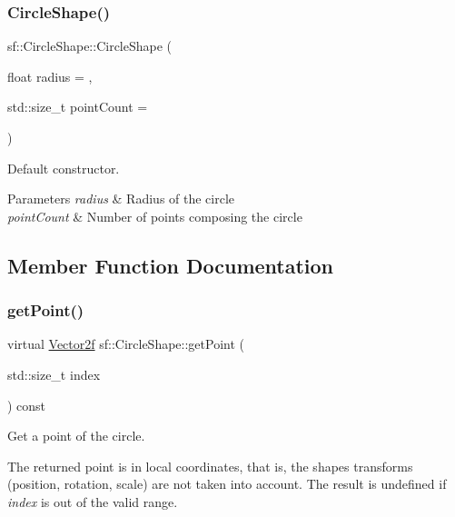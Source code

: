 \subsubsection{\texorpdfstring{Circle\+Shape()}{CircleShape()}}
{\footnotesize\ttfamily sf\+::\+Circle\+Shape\+::\+Circle\+Shape (\begin{DoxyParamCaption}\item[{float}]{radius = {},  }\item[{std\+::size\+\_\+t}]{point\+Count = {} }\end{DoxyParamCaption})\hspace{0.3cm}{\ttfamily [explicit]}}



Default constructor. 


\begin{DoxyParams}{Parameters}
{\em radius} & Radius of the circle \\
\hline
{\em point\+Count} & Number of points composing the circle \\
\hline
\end{DoxyParams}


\subsection{Member Function Documentation}
\mbox{\label{classsf_1_1_circle_shape_a2d7f9715502b960b92387102fddb8736}} 
\subsubsection{\texorpdfstring{get\+Point()}{getPoint()}}
{\footnotesize\ttfamily virtual \hyperlink{classsf_1_1_vector2}{Vector2f} sf\+::\+Circle\+Shape\+::get\+Point (\begin{DoxyParamCaption}\item[{std\+::size\+\_\+t}]{index }\end{DoxyParamCaption}) const\hspace{0.3cm}{\ttfamily [virtual]}}



Get a point of the circle. 

The returned point is in local coordinates, that is, the shape\textquotesingle{}s transforms (position, rotation, scale) are not taken into account. The result is undefined if {\itshape index} is out of the valid range.


